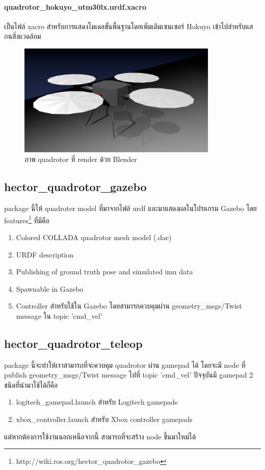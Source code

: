 \paragraph{quadrotor\_hokuyo\_utm30lx.urdf.xacro}
เป็นไฟล์ xacro สำหรับการแสดงโมเดลขั้นพื้นฐานโดยเพิ่มเติมเซนเซอร์ Hokuyo เข้าไปสำหรับแสกนสิ่งแวดล้อม

\begin{figure}[!ht]
	\centering
	\includegraphics[width=0.85\textwidth]{images/hector_quadrotor_render.png}
	\caption{ภาพ quadrotor ที่ render ด้วย Blender}
	\label{fig:hector_quadrotor_render}
\end{figure}

\subsection{hector\_quadrotor\_gazebo}
package นี้ให้ quadroter model ที่มาจากไฟล์ urdf และมาแสดงผลในโปรแกรม Gazebo โดย features\footnote{http://wiki.ros.org/hector\_quadrotor\_gazebo} ที่มีคือ
\begin{enumerate}[label=\arabic*), leftmargin=1.5cm]
	\setlength\itemsep{-0.25em}
	\item Colored COLLADA quadrotor mesh model (.dae)
	\item URDF description
	\item Publishing of ground truth pose and simulated imu data
	\item Spawnable in Gazebo
	\item Controller สำหรับใช้ใน Gazebo โดยสามารถควบคุมผ่าน geometry\_msgs/Twist message ใน topic 'cmd\_vel'
\end{enumerate}

\clearpage
\subsection{hector\_quadrotor\_teleop}
package นี้จะทำให้เราสามารถที่จะควบคุม quadrotor ผ่าน gamepad ได้ โดยจะมี node ที่ publish geometry\_msgs/Twist message ไปที่ topic 'cmd\_vel'
ปัจจุบันมี gamepad 2 ชนิดที่นำมาใช้ได้ก็คือ
\begin{enumerate}[label=\arabic*), leftmargin=1.5cm]
	\setlength\itemsep{-0.25em}
	\item logitech\_gamepad.launch สำหรับ Logitech gamepads
	\item xbox\_controller.launch สำหรับ Xbox controller gamepads 
\end{enumerate}
แต่หากต้องการใช้งานนอกเหนือจากนี้ สามารถที่จะสร้าง node ขึ้นมาใหม่ได้

